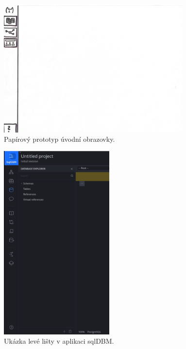 \begin{figure}[htb]
  \centering
  \includegraphics[height=70mm]{../img/uvodni-obrazovka}
  \caption{Papírový prototyp úvodní obrazovky.}
  \label{obr05:uvodni-obrazovka}
\end{figure}

\begin{figure}
  \centering
  \includegraphics[height=100mm]{../img/sqlDBM-leva-lista}
  \caption{Ukázka levé lišty v aplikaci sqlDBM.}
  \label{obr05:sqlDBM-leva-lista}
\end{figure}

